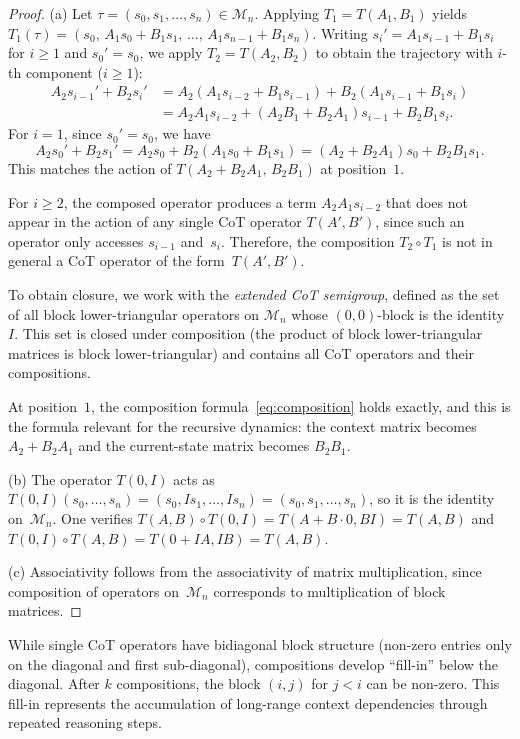 \begin{proof}
  (a) Let $\tau=(s_0,s_1,\dots,s_n)\in\mathcal{M}_n$. Applying $T_1=T(A_1,B_1)$
  yields $T_1(\tau)=(s_0,\,A_1 s_0+B_1 s_1,\,\dots,\,A_1 s_{n-1}+B_1 s_n)$.
  Writing $s_i'=A_1 s_{i-1}+B_1 s_i$ for $i\geq 1$ and $s_0'=s_0$, we apply
  $T_2=T(A_2,B_2)$ to obtain the trajectory with $i$-th component ($i\geq 1$):
  \begin{align*}
    A_2 s_{i-1}'+B_2 s_i'
    &= A_2(A_1 s_{i-2}+B_1 s_{i-1})+B_2(A_1 s_{i-1}+B_1 s_i) \\
    &= A_2 A_1 s_{i-2}+(A_2 B_1+B_2 A_1)s_{i-1}+B_2 B_1 s_i.
  \end{align*}
  For $i=1$, since $s_0'=s_0$, we have
  \[
    A_2 s_0'+B_2 s_1' = A_2 s_0 + B_2(A_1 s_0+B_1 s_1)
    = (A_2+B_2 A_1)s_0+B_2 B_1 s_1.
  \]
  This matches the action of $T(A_2+B_2 A_1,\,B_2 B_1)$ at position~$1$.

  For $i\geq 2$, the composed operator produces a term $A_2 A_1 s_{i-2}$ that
  does not appear in the action of any single CoT operator $T(A',B')$, since
  such an operator only accesses $s_{i-1}$ and~$s_i$. Therefore, the
  composition $T_2\circ T_1$ is not in general a CoT operator of the
  form~$T(A',B')$.

  To obtain closure, we work with the \emph{extended CoT semigroup}, defined as
  the set of all block lower-triangular operators on $\mathcal{M}_n$ whose
  $(0,0)$-block is the identity~$I$. This set is closed under composition
  (the product of block lower-triangular matrices is block lower-triangular)
  and contains all CoT operators and their compositions.

  At position~$1$, the composition formula~\eqref{eq:composition} holds
  exactly, and this is the formula relevant for the recursive dynamics:
  the context matrix becomes $A_2+B_2 A_1$ and the current-state matrix
  becomes $B_2 B_1$.

  (b) The operator $T(0,I)$ acts as
  $T(0,I)(s_0,\dots,s_n)=(s_0,Is_1,\dots,Is_n)=(s_0,s_1,\dots,s_n)$, so it
  is the identity on~$\mathcal{M}_n$. One verifies
  $T(A,B)\circ T(0,I)=T(A+B\cdot 0,BI)=T(A,B)$ and
  $T(0,I)\circ T(A,B)=T(0+IA,IB)=T(A,B)$.

  (c) Associativity follows from the associativity of matrix multiplication,
  since composition of operators on~$\mathcal{M}_n$ corresponds to
  multiplication of block matrices.
\end{proof}

\begin{remark}\label{rem:fill-in}
  While single CoT operators have bidiagonal block structure (non-zero entries
  only on the diagonal and first sub-diagonal), compositions develop
  ``fill-in'' below the diagonal. After $k$ compositions, the block $(i,j)$
  for $j<i$ can be non-zero. This fill-in represents the accumulation of
  long-range context dependencies through repeated reasoning steps.
\end{remark}

